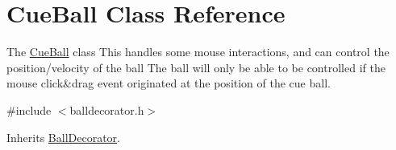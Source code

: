 \hypertarget{class_cue_ball}{}\section{Cue\+Ball Class Reference}
\label{class_cue_ball}


The \mbox{\hyperlink{class_cue_ball}{Cue\+Ball}} class This handles some mouse interactions, and can control the position/velocity of the ball The ball will only be able to be controlled if the mouse click\&drag event originated at the position of the cue ball.  




{\ttfamily \#include $<$balldecorator.\+h$>$}



Inherits \mbox{\hyperlink{class_ball_decorator}{Ball\+Decorator}}.

